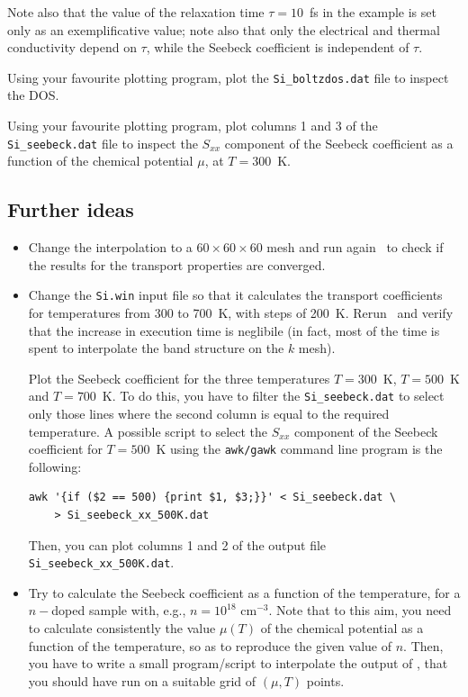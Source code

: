 \documentclass[a4paper,11pt,twoside]{article}
\begin{document}
Note also that the value of the relaxation time $\tau=10$~fs in the example is set only as an exemplificative value; note also that only the electrical and thermal conductivity depend on $\tau$, while the Seebeck coefficient is independent of $\tau$.

Using your favourite plotting program, plot the {\tt Si\_boltzdos.dat} file to inspect the DOS.

Using your favourite plotting program, plot columns 1 and 3 of the {\tt Si\_seebeck.dat} file to inspect the $S_{xx}$ component of the Seebeck coefficient as a function of the chemical potential $\mu$, at $T=300$~K.

\subsection*{Further ideas}

\begin{itemize}
\item Change the interpolation to a $60\times 60\times 60$ mesh and run again \postw\ to check if the results for the transport properties are converged. 

\item Change the {\tt Si.win} input file so that it calculates the transport coefficients for temperatures from 300 to 700~K, with steps of 200~K. Rerun \postw\ and verify that the increase in execution time is neglibile (in fact, most of the time is spent to interpolate the band structure on the $k$ mesh).

Plot the Seebeck coefficient for the three temperatures $T=300$~K, $T=500$~K and $T=700$~K. To do this, you have to filter the {\tt Si\_seebeck.dat} to select only those lines where the second column is equal to the required temperature. A possible script to select the $S_{xx}$ component of the Seebeck coefficient for $T=500$~K using the {\tt awk/gawk} command line program is the following:
\begin{verbatim}
awk '{if ($2 == 500) {print $1, $3;}}' < Si_seebeck.dat \
    > Si_seebeck_xx_500K.dat
\end{verbatim}
Then, you can plot columns 1 and 2 of the output file \verb#Si_seebeck_xx_500K.dat#.
\item Try to calculate the Seebeck coefficient as a function of the temperature, for a $n-$doped sample with, e.g., $n=10^{18}$ cm$^{-3}$. Note that to this aim, you need to calculate consistently the value $\mu(T)$ of the chemical potential as a function of the temperature, so as to reproduce the given value of $n$. Then, you have to write a small program/script to interpolate the output of \bw, that you should have run on a suitable grid of $(\mu,T)$ points.
\end{itemize}
\end{document}
